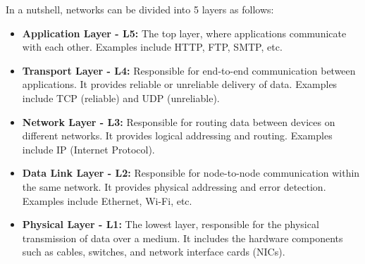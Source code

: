 \documentclass[openany,12pt]{book}
\begin{document}
In a nutshell, networks can be divided into 5 layers as follows:
\begin{itemize}
  \item \textbf{Application Layer - L5:} The top layer, where applications communicate with each other. Examples include HTTP, FTP, SMTP, etc.
  \item \textbf{Transport Layer - L4:} Responsible for end-to-end communication between applications. It provides reliable or unreliable delivery of data. Examples include TCP (reliable) and UDP (unreliable).
  \item \textbf{Network Layer - L3:} Responsible for routing data between devices on different networks. It provides logical addressing and routing. Examples include IP (Internet Protocol).
  \item \textbf{Data Link Layer - L2:} Responsible for node-to-node communication within the same network. It provides physical addressing and error detection. Examples include Ethernet, Wi-Fi, etc.
  \item \textbf{Physical Layer - L1:} The lowest layer, responsible for the physical transmission of data over a medium. It includes the hardware components such as cables, switches, and network interface cards (NICs).
\end{itemize}
\end{document}
